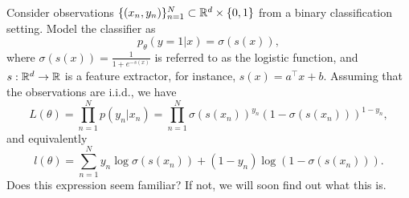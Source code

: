 \begin{example}
	Consider observations $\{(x_n,y_n)\}_{n=1}^N\subset {\mathbb R}^d\times \{0,1\}$ from a binary classification setting. Model the classifier as 
	\begin{equation}
		p_\theta(y=1|x) = \sigma(s(x)),
	\end{equation}
	where $\sigma(s(x)) = \frac{1}{1+e^{-s(x)}}$ is referred to as the logistic function, and $s:{\mathbb R}^d\to {\mathbb R}$ is a feature extractor, for instance, $s(x) = a^\top x + b$. Assuming that the observations are i.i.d., we have
	\begin{equation}
		L(\theta) = \prod_{n=1}^N p(y_n|x_n) = \prod_{n=1}^N \sigma(s(x_n))^{y_n} (1-\sigma(s(x_n)))^{1-y_n}, 
	\end{equation}
	and equivalently
	\begin{equation}
		l(\theta) = \sum_{n=1}^N y_n \log \sigma(s(x_n)) + (1-y_n)\log (1-\sigma(s(x_n))). 
	\end{equation}
	Does this expression seem familiar? If not, we will soon find out what this is.
\end{example}


